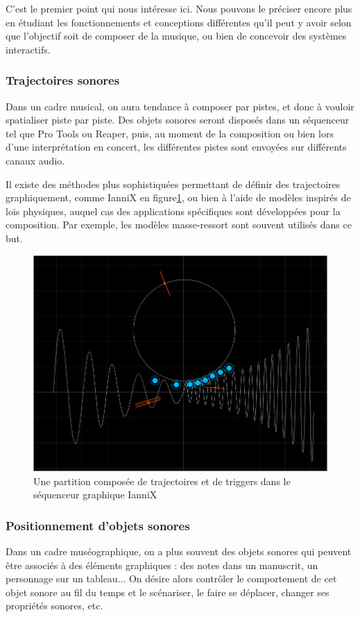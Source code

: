 \documentclass[french,12pt]{article}
\begin{document}
C'est le premier point qui nous intéresse ici. Nous pouvons le préciser encore plus en étudiant les fonctionnements et conceptions différentes qu'il peut y avoir selon que l'objectif soit de composer de la musique, ou bien de concevoir des systèmes interactifs.

\subsubsection{Trajectoires sonores}
Dans un cadre musical, on aura tendance à composer par pistes, et donc à vouloir spatialiser piste par piste. Des objets sonores seront disposés dans un séquenceur tel que Pro Tools ou Reaper, puis, au moment de la composition ou bien lors d'une interprétation en concert, les différentes pistes sont envoyées sur différents canaux audio.

Il existe des méthodes plus sophistiquées permettant de définir des trajectoires graphiquement, comme IanniX en figure\ref{fig.iannix}, ou bien à l'aide de modèles inspirés de lois physiques, auquel cas des applications spécifiques sont développées pour la composition. Par exemple, les modèles masse-ressort sont souvent utilisés dans ce but.

\begin{figure}[h]
\centering
\includegraphics[scale=0.3]{images/iannix.png}
\caption{Une partition composée de trajectoires et de triggers dans le séquenceur graphique IanniX}
\label{fig.iannix}
\end{figure}

\subsubsection{Positionnement d'objets sonores}
Dans un cadre muséographique, on a plus souvent des objets sonores qui peuvent être associés à des éléments graphiques : des notes dans un manuscrit, un personnage sur un tableau... On désire alors contrôler le comportement de cet objet sonore au fil du temps et le scénariser, le faire se déplacer, changer ses propriétés sonores, etc.
\end{document}
